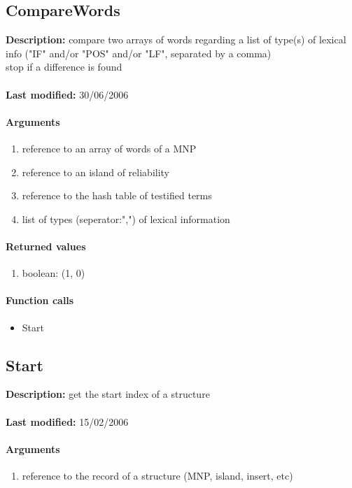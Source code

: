 \subsection{CompareWords}
\textbf{Description:} compare two arrays of words regarding a list of type(s) of lexical info ("IF" and/or "POS" and/or "LF", separated by a comma)\\
stop if a difference is found\\
\\\textbf{Last modified:} 30/06/2006

\paragraph{Arguments}
\begin{enumerate}
\item reference to an array of words of a MNP
\item reference to an island of reliability
\item reference to the hash table of testified terms
\item list of types (seperator:",") of lexical information
\end{enumerate}

\paragraph{Returned values}
\begin{enumerate}
\item boolean: (1, 0)
\end{enumerate}

\paragraph{Function calls}
\begin{itemize}
\item Start
\end{itemize}

\subsection{Start}
\textbf{Description:} get the start index of a structure\\
\\\textbf{Last modified:} 15/02/2006

\paragraph{Arguments}
\begin{enumerate}
\item reference to the record of a structure (MNP, island, insert, etc)
\end{enumerate}

